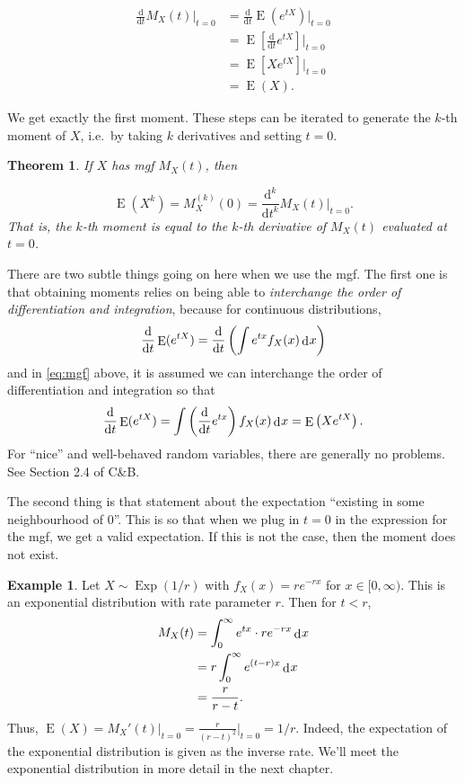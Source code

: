 \documentclass[
]{book}
\DeclareMathOperator{\E}{E}
\DeclareMathOperator{\Exp}{Exp}
\DeclareMathOperator{\dd}{d}
\newcommand{\dint}{\dd\hspace{0.5pt}\!}
\newcommand{\ddif}{\text{d}}
\newtheorem{theorem}{Theorem}[chapter]
\theoremstyle{definition}
\theoremstyle{definition}
\newtheorem{example}{Example}[chapter]
\theoremstyle{definition}
\theoremstyle{definition}
\theoremstyle{remark}
\begin{document}
\begin{align}
\frac{\ddif}{\ddif t}M_X(t) \bigg|_{t=0}
&= \frac{\ddif}{\ddif t}  \E(e^{tX}) \bigg|_{t=0} \nonumber \\
&=  \E\left[  \frac{\ddif}{\ddif t}e^{tX} \right]\bigg|_{t=0} \label{eq:mgf}   \\
&= \E[Xe^{tX}] \Big|_{t=0}  \nonumber \\ 
&= \E(X). \nonumber
\end{align}

We get exactly the first moment.
These steps can be iterated to generate the \(k\)-th moment of \(X\), i.e.~by taking \(k\) derivatives and setting \(t=0\).

\begin{theorem}
If \(X\) has mgf \(M_X(t)\), then

\[
\E(X^k) = M_X^{(k)}(0) = \frac{\ddif^k}{\ddif t^k}M_X(t) \bigg|_{t=0}.
\]
That is, the \(k\)-th moment is equal to the \(k\)-th derivative of \(M_X(t)\) evaluated at \(t=0\).
\end{theorem}

There are two subtle things going on here when we use the mgf.
The first one is that obtaining moments relies on being able to \emph{interchange the order of differentiation and integration}, because for continuous distributions,
\[
\frac{\ddif}{\ddif t}  \E(e^{tX}) = \frac{\ddif}{\ddif t} \left(\int e^{tx}f_X(x)\dint x \right)
\]
and in \eqref{eq:mgf} above, it is assumed we can interchange the order of differentiation and integration so that
\[
\frac{\ddif}{\ddif t}  \E(e^{tX}) = \int \left( \frac{\ddif}{\ddif t}  e^{tx} \right) f_X(x) \dint x = \E\left(Xe^{tX}\right).
\]
For ``nice'' and well-behaved random variables, there are generally no problems.
See Section 2.4 of C\&B.

The second thing is that statement about the expectation ``existing in some neighbourhood of 0''.
This is so that when we plug in \(t=0\) in the expression for the mgf, we get a valid expectation.
If this is not the case, then the moment does not exist.

\begin{example}
Let \(X\sim\Exp(1/r)\) with \(f_X(x)=r e^{-r x}\) for \(x\in[0,\infty)\).
This is an exponential distribution with rate parameter \(r\).
Then for \(t<r\),
\begin{align*}
M_X(t) 
&= \int_0^\infty e^{tx}\cdot r e^{- r x} \dint x  \\
&= r \int_0^\infty e^{(t- r)x} \dint x \\
&= \frac{ r}{ r-  t}.
\end{align*}
Thus, \(\E(X)=M_X'(t)\big|_{t=0}=\frac{r}{(r-t)^2}\Big|_{t=0}=1/r\).
Indeed, the expectation of the exponential distribution is given as the inverse rate.
We'll meet the exponential distribution in more detail in the next chapter.
\end{example}
\end{document}
